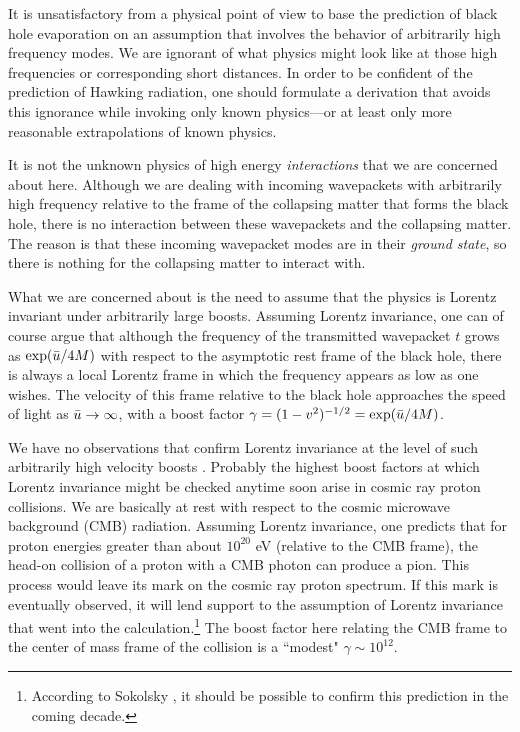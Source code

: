 It is unsatisfactory from a physical point of view to base
the prediction of black hole evaporation on an assumption
that involves the behavior of arbitrarily high frequency
modes. We are ignorant of what physics might look like at
those high frequencies or corresponding short distances.
In order to be confident of the prediction of Hawking
radiation, one should formulate a derivation that avoids
this ignorance while invoking only known physics---or at
least only more reasonable extrapolations of known physics.

It is not the unknown physics of high energy
{\it interactions} that we are concerned about here.
Although we are dealing with incoming
wavepackets with arbitrarily high frequency relative to
the frame of the collapsing matter that forms the black
hole, there is no interaction between these wavepackets
and the collapsing matter. The reason is that these incoming
wavepacket modes are in their {\it ground state}, so there
is nothing for the collapsing matter to interact with.

What we are concerned about is the need to assume that
the physics is Lorentz invariant under arbitrarily large boosts.
Assuming Lorentz invariance, one can of course argue
that although the frequency of the transmitted wavepacket $t$
grows as $\exp(\bar{u}/4M)$ with respect to the asymptotic rest frame
of the black hole, there is always a local Lorentz
frame in which the frequency appears as low as one wishes.
The velocity of this frame relative to the black hole
approaches the speed of light as $\bar{u}\rightarrow\infty$,
with a boost factor $\gamma=(1-v^2)^{-1/2}=\exp(\bar{u}/4M)$.

We have no observations that confirm Lorentz invariance
at the level of such arbitrarily high velocity boosts
\cite{Blok,NielPic,Will}.
Probably the highest boost factors at which Lorentz invariance
might be checked anytime soon arise in cosmic ray proton
collisions. We are basically at rest with respect to the cosmic
microwave background (CMB) radiation. Assuming Lorentz
invariance, one predicts that for proton energies greater
than about $10^{20}$ eV (relative to the CMB frame),
the head-on collision of a proton with a CMB photon can
produce a pion. This process would leave its mark on the
cosmic ray proton spectrum. If this mark is eventually
observed, it will lend support to the assumption of
Lorentz invariance that went into the
calculation.\footnote{According to Sokolsky \cite{Sokol}, it
should be possible to confirm this prediction in the coming decade.}
The boost factor here relating the CMB frame to the center of mass
frame of the collision is a ``modest" $\gamma\sim 10^{12}$.

